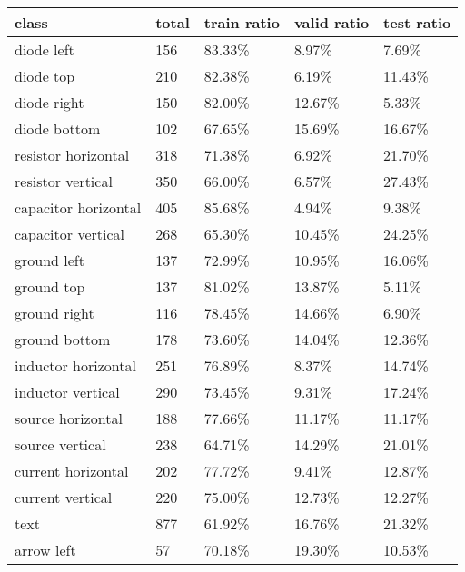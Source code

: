 \begin{table}
\begin{center}
\begin{tabular}{l|l|l|l|l|}

\textbf{class} & \textbf{total} & \textbf{train ratio} & \textbf{valid ratio} & \textbf{test ratio} \\
    \hline
    diode left              & 156    &  83.33\%  &    8.97\%  &  7.69\% \\
    diode top               & 210    &  82.38\%  &    6.19\%  & 11.43\% \\
    diode right             & 150    &  82.00\%  &   12.67\%  &  5.33\% \\
    diode bottom            & 102    &  67.65\%  &   15.69\%  & 16.67\% \\
    resistor horizontal     & 318    &  71.38\%  &    6.92\%  & 21.70\% \\
    resistor vertical       & 350    &  66.00\%  &    6.57\%  & 27.43\% \\
    capacitor horizontal    & 405    &  85.68\%  &    4.94\%  &  9.38\% \\
    capacitor vertical      & 268    &  65.30\%  &   10.45\%  & 24.25\% \\
    ground left             & 137    &  72.99\%  &   10.95\%  & 16.06\% \\
    ground top              & 137    &  81.02\%  &   13.87\%  &  5.11\% \\
    ground right            & 116    &  78.45\%  &   14.66\%  &  6.90\% \\
    ground bottom           & 178    &  73.60\%  &   14.04\%  & 12.36\% \\
    inductor horizontal     & 251    &  76.89\%  &    8.37\%  & 14.74\% \\
    inductor vertical       & 290    &  73.45\%  &    9.31\%  & 17.24\% \\
    source horizontal       & 188    &  77.66\%  &   11.17\%  & 11.17\% \\
    source vertical         & 238    &  64.71\%  &   14.29\%  & 21.01\% \\
    current horizontal      & 202    &  77.72\%  &    9.41\%  & 12.87\% \\
    current vertical        & 220    &  75.00\%  &   12.73\%  & 12.27\% \\
    text                    & 877    &  61.92\%  &   16.76\%  & 21.32\% \\
    arrow left              & 57     &  70.18\%  &   19.30\%  & 10.53\% \\

\end{tabular}
\end{center}
\end{table}
